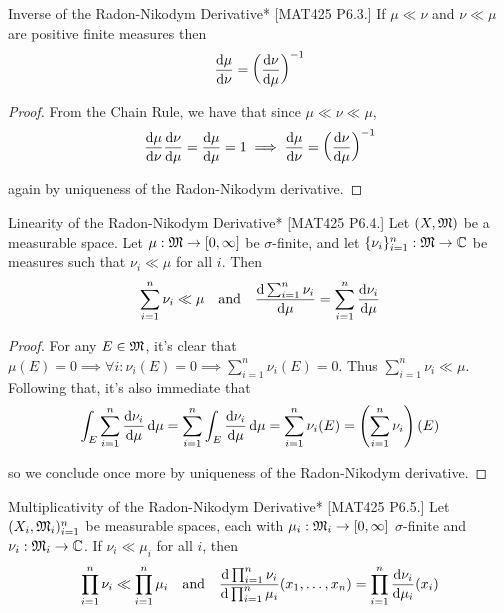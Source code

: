 \begin{problem}{Inverse of the Radon-Nikodym Derivative}*
    [MAT425 P6.3.] If $\mu \ll \nu$ and $\nu \ll \mu$ are positive finite measures then 
    $$
        \frac{\mathrm{d}\mu}{\mathrm{d}\nu} = \left( \frac{\mathrm{d}\nu}{\mathrm{d}\mu} \right)^{-1}
    $$
\end{problem}

\begin{proof}
    From the Chain Rule, we have that since $\mu \ll \nu \ll \mu$, 
    $$
        \frac{\mathrm{d}\mu}{\mathrm{d}\nu}\frac{\mathrm{d}\nu}{\mathrm{d}\mu} = \frac{\mathrm{d}\mu}{\mathrm{d}\mu} = 1
        \implies 
        \frac{\mathrm{d}\mu}{\mathrm{d}\nu} = \left( \frac{\mathrm{d}\nu}{\mathrm{d}\mu} \right)^{-1} 
    $$

    again by uniqueness of the Radon-Nikodym derivative. 
\end{proof}

\begin{problem}{Linearity of the Radon-Nikodym Derivative}*
    [MAT425 P6.4.] Let $(X, \mathfrak{M})$ be a measurable space. Let $\mu : \mathfrak{M} \to [0, \infty]$ be $\sigma$-finite, and let $\{\nu_i\}_{i=1}^n : \mathfrak{M} \to \mathbb{C}$ be measures such that $\nu_i \ll \mu$ for all $i$. Then 
    $$
        \sum_{i=1}^n \nu_i \ll \mu
        \quad \text{and} \quad 
        \frac{\mathrm{d} \sum_{i=1}^n \nu_i}{\mathrm{d} \mu} = \sum_{i=1}^n \frac{\mathrm{d} \nu_i}{\mathrm{d}\mu}
    $$
\end{problem}

\begin{proof}
    For any $E \in \mathfrak{M}$, it's clear that $\mu(E) = 0 \implies \forall i: \nu_i(E) = 0 \implies \sum_{i=1}^n \nu_i(E) = 0$. Thus $\sum_{i=1}^n \nu_i \ll \mu$. Following that, it's also immediate that 
    $$
        \int_E \sum_{i=1}^n \frac{\mathrm{d}\nu_i}{\mathrm{d}\mu} \, \mathrm{d}\mu
        = \sum_{i=1}^n \int_E \frac{\mathrm{d}\nu_i}{\mathrm{d}\mu} \, \mathrm{d}\mu
        = \sum_{i=1}^n \nu_i(E)
        = \left( \sum_{i=1}^n \nu_i \right) (E)
    $$

    so we conclude once more by uniqueness of the Radon-Nikodym derivative. 
\end{proof}

\begin{problem}{Multiplicativity of the Radon-Nikodym Derivative}*
    [MAT425 P6.5.] Let $(X_i, \mathfrak{M}_i)_{i=1}^n$ be measurable spaces, each with $\mu_i : \mathfrak{M}_i \to [0, \infty]$ $\sigma$-finite and $\nu_i : \mathfrak{M}_i \to \mathbb{C}$. If $\nu_i \ll \mu_i$ for all $i$, then
    $$
        \prod_{i=1}^n \nu_i \ll \prod_{i=1}^n \mu_i 
        \quad \text{and} \quad 
        \frac{ \mathrm{d} \prod_{i=1}^n \nu_i }{ \mathrm{d} \prod_{i=1}^n \mu_i } (x_1, \dots, x_n) = \prod_{i=1}^n \frac{\mathrm{d}\nu_i}{\mathrm{d}\mu_i} (x_i) 
    $$
\end{problem}

